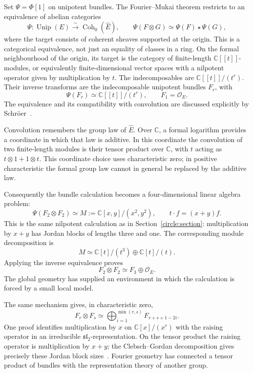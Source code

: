 \documentclass[11pt]{article}
\theoremstyle{remark}
\newcommand{\C}{\mathbb C}
\begin{document}
Set \(\Psi=\Phi[1]\) on unipotent bundles. The Fourier--Mukai theorem restricts to an equivalence of abelian categories
\begin{equation}
\Psi:\operatorname{Unip}(E)
\overset{\sim}{\longrightarrow}
\operatorname{Coh}_0(\widehat E),
\qquad
\Psi(F\otimes G)\simeq\Psi(F)\star\Psi(G),
\label{categorical:unipotent}
\end{equation}
where the target consists of coherent sheaves supported at the origin. This is a categorical equivalence, not just an equality of classes in a ring. On the formal neighbourhood of the origin, its target is the category of finite-length \(\mathbb C[[t]]\)-modules, or equivalently finite-dimensional vector spaces with a nilpotent operator given by multiplication by \(t\). The indecomposables are \(\mathbb C[[t]]/(t^r)\). Their inverse transforms are the indecomposable unipotent bundles \(F_r\), with
\begin{equation}
\Psi(F_r)\simeq\mathbb C[[t]]/(t^r),
\qquad F_1=\mathcal O_E.
\label{categorical:fr}
\end{equation}
The equivalence and its compatibility with convolution are discussed explicitly by Schr\"oer~\cite{schroer}.

Convolution remembers the group law of \(\widehat E\). Over \(\mathbb C\), a formal logarithm provides a coordinate in which that law is additive. In this coordinate the convolution of two finite-length modules is their tensor product over \(\mathbb C\), with \(t\) acting as \(t\otimes1+1\otimes t\). This coordinate choice uses characteristic zero; in positive characteristic the formal group law cannot in general be replaced by the additive law.

Consequently the bundle calculation becomes a four-dimensional linear algebra problem:
\[
\Psi(F_2\otimes F_2)
\simeq M:=\mathbb C[x,y]/(x^2,y^2),
\qquad t\cdot f=(x+y)f.
\]
This is the same nilpotent calculation as in Section~\ref{circle:section}: multiplication by \(x+y\) has Jordan blocks of lengths three and one. The corresponding module decomposition is
\[
M\simeq\C[t]/(t^3)\oplus\C[t]/(t).
\]
Applying the inverse equivalence proves
\begin{equation}
\boxed{F_2\otimes F_2\simeq F_3\oplus\mathcal O_E.}
\label{categorical:f2-product}
\end{equation}
The global geometry has supplied an environment in which the calculation is forced by a small local model.

The same mechanism gives, in characteristic zero,
\begin{equation}
F_r\otimes F_s\simeq
\bigoplus_{i=1}^{\min(r,s)}F_{r+s+1-2i}.
\label{categorical:clebsch-gordan}
\end{equation}
One proof identifies multiplication by \(x\) on \(\mathbb C[x]/(x^r)\) with the raising operator in an irreducible \(\mathfrak{sl}_2\)-representation. On the tensor product the raising operator is multiplication by \(x+y\); the Clebsch--Gordan decomposition gives precisely these Jordan block sizes~\cite{chen}. Fourier geometry has connected a tensor product of bundles with the representation theory of another group.
\end{document}
